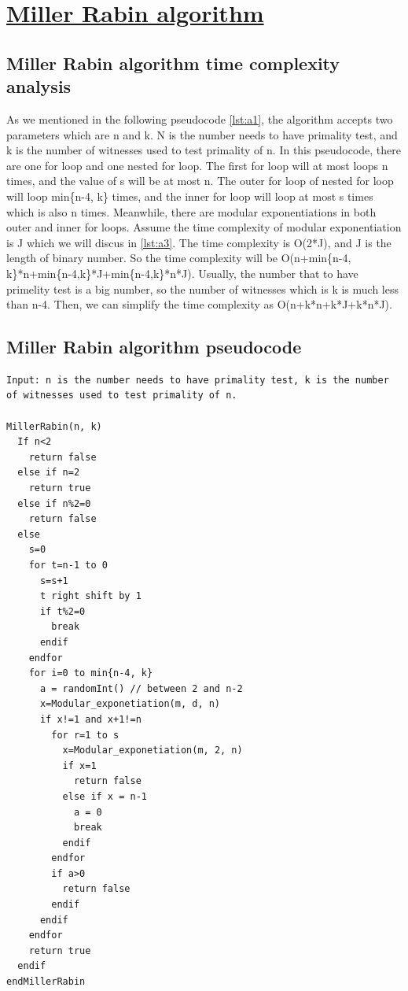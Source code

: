 \documentclass[12pt, oneside]{book}
\begin{document}
\section{\underline{Miller Rabin algorithm}}
\subsection{Miller Rabin algorithm time complexity analysis}
As we mentioned in the following pseudocode \ref{lst:a1}, the algorithm accepts two parameters which are n and k. N is the number needs to have primality test, and k is the number of witnesses used to test primality of n. In this pseudocode, there are one for loop and one nested for loop. The first for loop will at most loops n times, and the value of s will be at most n. The outer for loop of nested for loop will loop min\{n-4, k\} times, and the inner for loop will loop at most s times which is also n times. Meanwhile, there are modular exponentiations in both outer and inner for loops. Assume the time complexity of modular exponentiation is J which we will discus in \ref{lst:a3}. The time complexity is O(2*J), and J is the length of binary number. So the time complexity will be O(n+min\{n-4, k\}*n+min\{n-4,k\}*J+min\{n-4,k\}*n*J). Usually, the number that to have primelity test is a big number, so the number of witnesses which is k is much less than n-4. Then, we can simplify the time complexity as O(n+k*n+k*J+k*n*J).

\newpage
\subsection{Miller Rabin algorithm pseudocode}
\begin{spacing}{1.0}
\begin{lstlisting}[label={lst:a1}, caption=Primality test using Miller-Rabin algorithm.]
Input: n is the number needs to have primality test, k is the number of witnesses used to test primality of n.

MillerRabin(n, k)
  If n<2
    return false
  else if n=2
    return true
  else if n%2=0
    return false
  else
    s=0
    for t=n-1 to 0
      s=s+1
      t right shift by 1
      if t%2=0
        break
      endif
    endfor
    for i=0 to min{n-4, k}
      a = randomInt() // between 2 and n-2 
      x=Modular_exponetiation(m, d, n)
      if x!=1 and x+1!=n
        for r=1 to s
          x=Modular_exponetiation(m, 2, n)
          if x=1
            return false
          else if x = n-1
            a = 0
            break
          endif
        endfor
        if a>0
          return false
        endif
      endif
    endfor
    return true
  endif
endMillerRabin
\end{lstlisting}
\end{spacing}
\end{document}
